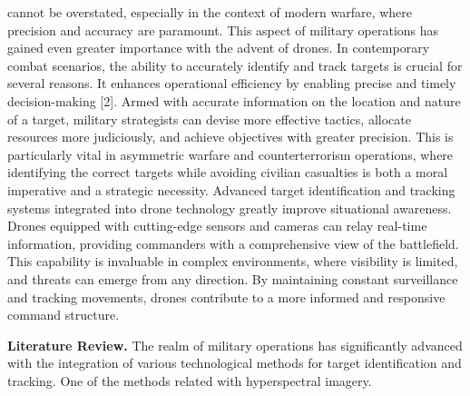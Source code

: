 cannot be overstated, especially in the context of modern warfare, where
precision and accuracy are paramount. This aspect of military operations
has gained even greater importance with the advent of drones. In
contemporary combat scenarios, the ability to accurately identify and
track targets is crucial for several reasons. It enhances operational
efficiency by enabling precise and timely decision-making {[}2{]}. Armed
with accurate information on the location and nature of a target,
military strategists can devise more effective tactics, allocate
resources more judiciously, and achieve objectives with greater
precision. This is particularly vital in asymmetric warfare and
counterterrorism operations, where identifying the correct targets while
avoiding civilian casualties is both a moral imperative and a strategic
necessity. Advanced target identification and tracking systems
integrated into drone technology greatly improve situational awareness.
Drones equipped with cutting-edge sensors and cameras can relay
real-time information, providing commanders with a comprehensive view of
the battlefield. This capability is invaluable in complex environments,
where visibility is limited, and threats can emerge from any direction.
By maintaining constant surveillance and tracking movements, drones
contribute to a more informed and responsive command structure.

\textbf{Literature Review.} The realm of military operations has
significantly advanced with the integration of various technological
methods for target identification and tracking. One of the methods
related with hyperspectral imagery.

